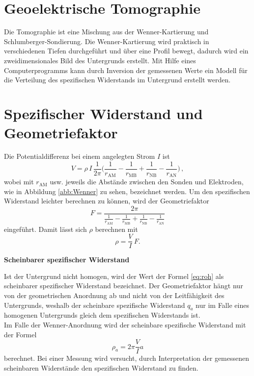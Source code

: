 \section{Geoelektrische Tomographie}
Die Tomographie ist eine Mischung aus der Wenner-Kartierung und Schlumberger-Sondierung. Die Wenner-Kartierung wird praktisch in verschiedenen Tiefen durchgeführt und über eine Profil bewegt, dadurch wird ein zweidimensionales Bild des Untergrunds erstellt.
Mit Hilfe eines Computerprogramms kann durch Inversion der gemessenen Werte ein Modell für die Verteilung des spezifischen Widerstands im Untergrund erstellt werden.

\section{Spezifischer Widerstand und Geometriefaktor}
\label{sec:spezW}

Die Potentialdifferenz bei einem angelegten Strom $I$ ist
\begin{equation}
V = \rho \, I \, \frac{1}{2 \pi} \big(\frac{1}{r_{\mathrm{AM}}} - \frac{1}{r_{\mathrm{MB}}} + \frac{1}{r_{\mathrm{NB}}} - \frac{1}{r_{\mathrm{AN}}} \big) \, ,
\end{equation}
wobei mit $r_{\mathrm{AM}}$ usw. jeweils die Abstände zwischen den Sonden und Elektroden, wie in Abbildung \ref{abb:Wenner} zu sehen, bezeichnet werden.
Um den spezifischen Widerstand leichter berechnen zu können, wird der Geometriefaktor
$$F = \frac{2 \pi}{\frac{1}{r_{\mathrm{AM}}} - \frac{1}{r_{\mathrm{MB}}} + \frac{1}{r_{\mathrm{NB}}} - \frac{1}{r_{\mathrm{AN}}}}$$
eingeführt.
Damit lässt sich $\rho$ berechnen mit 
\begin{equation}
\rho = \frac{V}{I} \, F.
 \label{eq:roh}
\end{equation}

\textbf{Scheinbarer spezifischer Widerstand}

Ist der Untergrund nicht homogen, wird der Wert der Formel \eqref{eq:roh} als scheinbarer spezifischer Widerstand bezeichnet. Der Geometriefaktor hängt nur von der geometrischen Anordnung ab und nicht von der 
Leitfähigkeit des Untergrunds, weshalb der scheinbare spezifische Widerstand $q_a$ nur im Falle eines homogenen Untergrunds gleich dem spezifischen Widerstands ist.\\
Im Falle der Wenner-Anordnung wird  der scheinbare spezifische Widerstand mit der Formel
$$ \rho_a = 2 \pi \frac{V}{I} a $$
berechnet.
Bei einer Messung wird versucht, durch Interpretation der gemessenen scheinbaren Widerstände den spezifischen Widerstand zu finden.